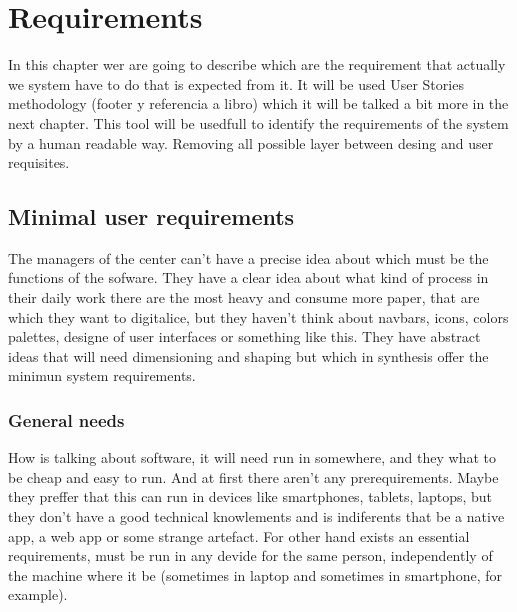 \chapter{Requirements}

In this chapter wer are going to describe which are the requirement that
actually we system have to do that is expected from it.
It will be used User Stories methodology (footer y referencia a libro) which
it will be talked a bit more in the next chapter.
This tool will be usedfull to identify the requirements of the system by a
human readable way. Removing all possible layer between desing and user requisites.

\section{Minimal user requirements}

The managers of the center can't have a precise idea about which must be the functions of the sofware. They have a clear idea about what kind of process in their daily work there are the most heavy and consume more paper, that are which they want to digitalice, but they haven't think about navbars, icons, colors palettes, designe of user interfaces or something like this.  They have abstract ideas that will need dimensioning and shaping but which in synthesis offer the minimun system requirements.

\subsection{General needs}
How is talking about software, it will need run in somewhere, and they what to be cheap and easy to run. And at first there aren't any prerequirements. Maybe they preffer that this can run in devices like smartphones, tablets, laptops, but they don't have a good technical knowlements and is indiferents that be a native app, a web app or some strange artefact.
For other hand exists an essential requirements, must be run in any devide for the same person, independently of the machine where it be (sometimes in laptop and sometimes in smartphone, for example).

\noindent{}

